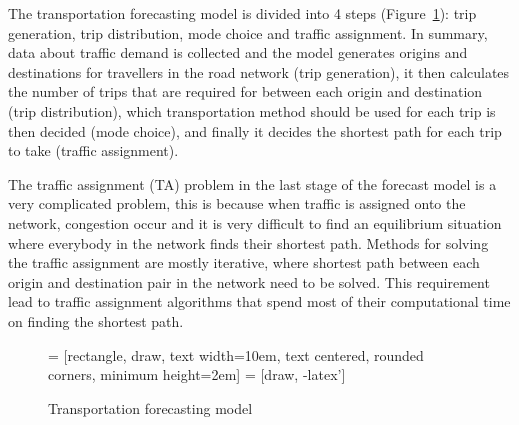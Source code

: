 The transportation forecasting model is divided into 4 steps (Figure~\ref{fig:model}): trip generation, trip distribution, mode choice and traffic assignment.
In summary, 
data about traffic demand is collected and the
model generates origins and destinations for travellers in the road network (trip generation),
it then calculates the number of trips that are required for between each origin and destination (trip distribution),
which transportation method should be used for each trip is then decided (mode choice),
and finally it decides the shortest path for each trip to take (traffic assignment).

The traffic assignment (TA) problem in the last stage of the forecast model is a very complicated problem, 
this is because when traffic is assigned onto the network,
congestion occur and it is very difficult to find an equilibrium situation where everybody in the network finds their shortest path.
Methods for solving the traffic assignment are mostly iterative,
where shortest path between each origin and destination pair in the network need to be solved.
This requirement lead to traffic assignment algorithms that spend most of their computational time on finding the shortest path.

\begin{figure}
    \centering
     = [rectangle, draw, text width=10em, text centered, rounded corners, minimum height=2em]
     = [draw, -latex']
    \caption{Transportation forecasting model}
    \label{fig:model}
\end{figure}

